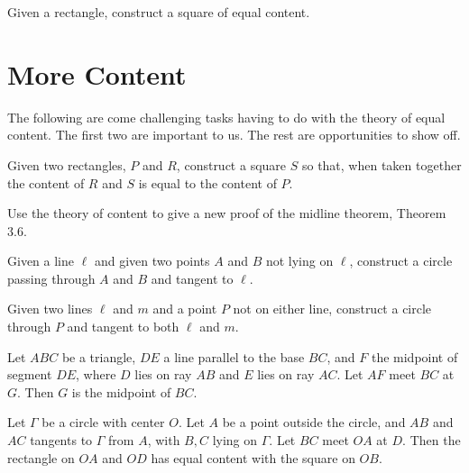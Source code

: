 \begin{problem}\label{prob:quadrature-of-rectangle}
Given a rectangle, construct a square of equal content.
\end{problem}




\chapter{More Content}

The following are come challenging tasks having to do with the theory of equal content.
The first two are important to us.
The rest are opportunities to show off.

\begin{problem}\label{prob:subtract-rect}
Given two rectangles, $P$ and $R$, construct a square $S$ so that, when taken together the content of $R$ and $S$ is equal to the content of $P$.
\end{problem}

\begin{problem} \label{conj:parallel-in-triangle} Use the theory of content to give a new proof of the midline theorem, Theorem 3.6.
\end{problem}

\begin{challenge}\label{chal:circle-given-two-points-tangent}
Given a line $\ell$ and given two points $A$ and $B$ not lying on $\ell$, construct a circle passing through $A$ and $B$ and tangent to $\ell$.
\end{challenge}

\begin{challenge}\label{chal:circle-point-two-tangents}
Given two lines $\ell$ and $m$ and a point $P$ not on either line, construct a circle through $P$ and tangent to both $\ell$ and $m$.
\end{challenge}

\begin{conjecture}\label{conj:content-triangle}
Let $ABC$ be a triangle, $DE$ a line parallel to the base $BC$, and $F$ the midpoint of segment $DE$, where $D$ lies on ray $AB$ and $E$ lies on ray $AC$. Let $AF$ meet $BC$ at $G$. Then $G$ is the midpoint of $BC$.
\end{conjecture}


\begin{conjecture}\label{conj:content-circle}
Let $\Gamma$ be a circle with center $O$. Let $A$ be a point outside the circle, and $AB$ and $AC$ tangents to $\Gamma$ from $A$, with $B, C$ lying on $\Gamma$. Let $BC$ meet $OA$ at $D$. Then the rectangle on $OA$ and $OD$ has equal content with the square on $OB$.
\end{conjecture}

